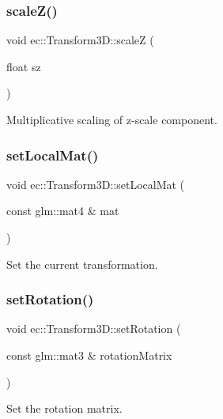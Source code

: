 \subsubsection{\texorpdfstring{scale\+Z()}{scaleZ()}}
{\footnotesize\ttfamily void ec\+::\+Transform3\+D\+::scaleZ (\begin{DoxyParamCaption}\item[{float}]{sz }\end{DoxyParamCaption})}

Multiplicative scaling of z-\/scale component. \mbox{\label{classec_1_1_transform3_d_a5cc1409f0c09910a701dcd294e797498}} 
\subsubsection{\texorpdfstring{set\+Local\+Mat()}{setLocalMat()}}
{\footnotesize\ttfamily void ec\+::\+Transform3\+D\+::set\+Local\+Mat (\begin{DoxyParamCaption}\item[{const glm\+::mat4 \&}]{mat }\end{DoxyParamCaption})}

Set the current transformation. \mbox{\label{classec_1_1_transform3_d_adc80d3f045c44c02bec2f2c1db2144db}} 
\subsubsection{\texorpdfstring{set\+Rotation()}{setRotation()}}
{\footnotesize\ttfamily void ec\+::\+Transform3\+D\+::set\+Rotation (\begin{DoxyParamCaption}\item[{const glm\+::mat3 \&}]{rotation\+Matrix }\end{DoxyParamCaption})}

Set the rotation matrix. \mbox{\label{classec_1_1_transform3_d_af8c2d1832acc0b0b52e217de4efa4d91}} 
